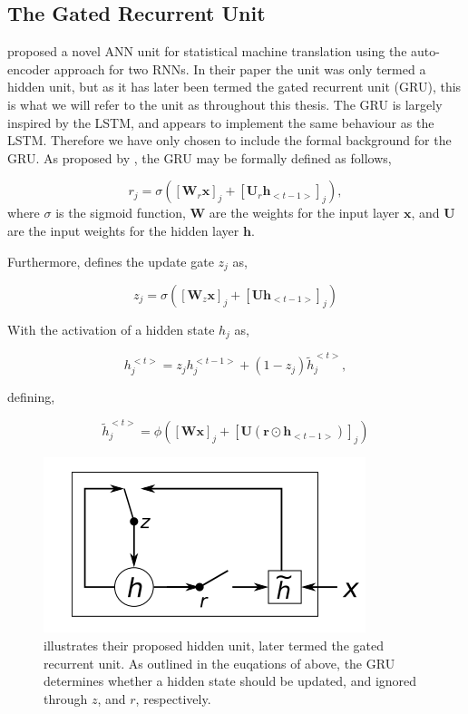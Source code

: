 \subsection{The Gated Recurrent Unit}\label{GRU}

\cite{Cho2014} proposed a novel ANN unit for statistical machine translation using the auto-encoder approach for two RNNs. In their paper the unit was only termed a hidden unit, but as it has later been termed the gated recurrent unit (GRU), this is what we will refer to the unit as throughout this thesis. The GRU is largely inspired by the LSTM, and appears to implement the same behaviour as the LSTM. Therefore we have only chosen to include the formal background for the GRU. As proposed by \cite{Cho2014}, the GRU may be formally defined as follows,

\begin{equation}
    r_j = \sigma ([\textbf{W}_r \textbf{x}]_j + [\textbf{U}_r\textbf{h}_{<t-1>}]_j), 
\end{equation}
where $\sigma$ is the sigmoid function, $\textbf{W}$ are the weights for the input layer $\textbf{x}$, and $\textbf{U}$ are the input weights for the hidden layer $\textbf{h}$.

Furthermore, \cite{Cho2014} defines the update gate $z_j$ as,

\begin{equation}
    z_j = \sigma([\textbf{W}_z\textbf{x}]_j + [\textbf{U}\textbf{h}_{<t-1>}]_j)
\end{equation}
 
With the activation of a hidden state $h_j$ as,
 
\begin{equation}
    h_j^{<t>} = z_j h_j^{<t-1>} + (1 - z_j) \tilde{h}_j^{<t>},
\end{equation}
 
defining,
 
\begin{equation}
    \tilde{h}_j^{<t>} = \phi ([\textbf{W}\textbf{x}]_j + [\textbf{U}(\textbf{r} \odot \textbf{h}_{<t-1>})]_j)
\end{equation}

\begin{figure}
\centering
\includegraphics{fig/cho_gru}
\caption{\cite{Cho2014} illustrates their proposed hidden unit, later termed the gated recurrent unit. As outlined in the euqations of \cite{Cho2014} above, the GRU determines whether a hidden state should be updated, and ignored through $z$, and $r$, respectively.}
\label{fig:cho_gru}
\end{figure}

